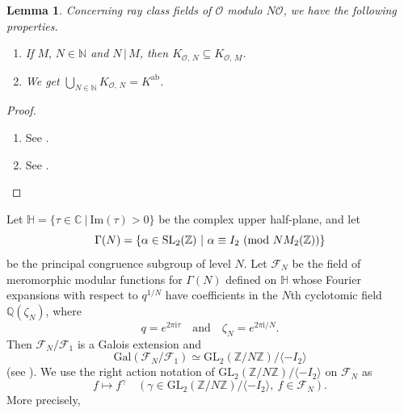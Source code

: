 \documentclass[reqno,11pt]{article}
\newcommand{\Mod}[1]{\ (\textup{mod}\ #1)}
\theoremstyle{plain} %
\newtheorem{lemma}[theorem]{\indent\sc Lemma}
\theoremstyle{definition} %
\begin{document}
\begin{lemma}\label{basic}
Concerning ray class fields of $\mathcal{O}$ modulo $N\mathcal{O}$, we have the following properties.
\begin{enumerate}
\item[\textup{(i)}] If $M,\,N\in\mathbb{N}$ and $N\,|\,M$, then
$K_{\mathcal{O},\,N}\subseteq K_{\mathcal{O},\,M}$.
\item[\textup{(ii)}] We get
$\displaystyle
\bigcup_{N\in\mathbb{N}}K_{\mathcal{O},\,N}=K^\mathrm{ab}$.
\end{enumerate}
\end{lemma}
\begin{proof}
\begin{enumerate}
\item[(i)] See \cite[$\S$4, p. 169]{Stevenhagen}.
\item[(ii)] See \cite[Lemma 4.1 (3)]{J-K-S}.  
\end{enumerate}
\end{proof}

Let $\mathbb{H}=\{\tau\in\mathbb{C}~|~\mathrm{Im}(\tau)>0\}$ be the
complex upper half-plane, and let
\begin{equation*}
\Gamma(N)=\{\alpha\in\mathrm{SL}_2(\mathbb{Z})~|~\alpha\equiv I_2\Mod{NM_2(\mathbb{Z})}\}
\end{equation*}
be the principal congruence subgroup of level $N$. 
Let $\mathcal{F}_N$ be the field of meromorphic modular functions for 
$\Gamma(N)$ defined on $\mathbb{H}$
whose Fourier expansions with respect to 
$q^{1/N}$ have coefficients in the $N$th cyclotomic field $\mathbb{Q}(\zeta_N)$,
where
\begin{equation*}
q=e^{2\pi\mathrm{i}\tau}\quad\textrm{and}\quad\zeta_N=e^{2\pi\mathrm{i}/N}. 
\end{equation*}
Then $\mathcal{F}_N/\mathcal{F}_1$ is
a Galois extension and
\begin{equation}\label{GFF}
\mathrm{Gal}(\mathcal{F}_N/\mathcal{F}_1)
\simeq\mathrm{GL}_2(\mathbb{Z}/N\mathbb{Z})/\langle-I_2\rangle
\end{equation}
(see \cite[Theorem 6.6 and Propositions 6.1 and 6.9 (1)]{Shimura}). 
We use the right action notation of $\mathrm{GL}_2(\mathbb{Z}/N\mathbb{Z})/\langle-I_2
\rangle$ on $\mathcal{F}_N$ as
\begin{equation*}
f\mapsto f^\gamma\quad(\gamma\in\mathrm{GL}_2(\mathbb{Z}/N\mathbb{Z})/\langle-I_2\rangle,~
f\in\mathcal{F}_N). 
\end{equation*}
More precisely,
\end{document}
